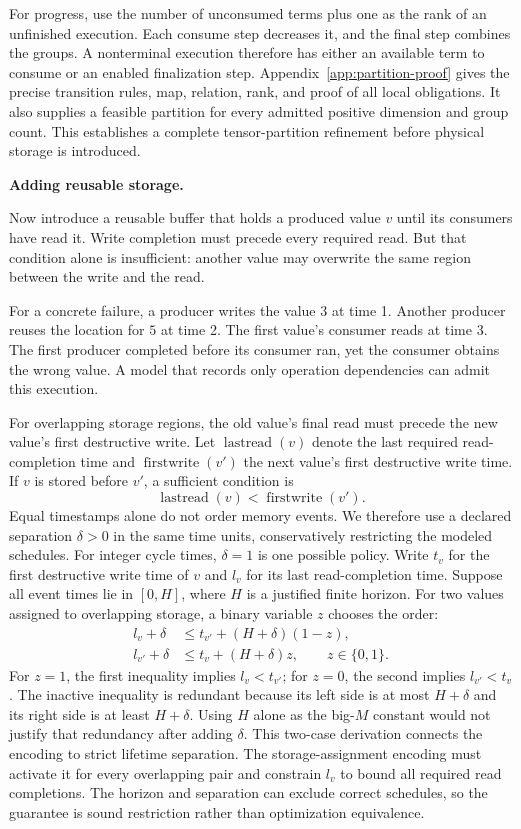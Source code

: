 \documentclass[11pt]{article}
\begin{document}
For progress, use the number of unconsumed terms plus one as the rank of an unfinished execution. Each consume step decreases it, and the final step combines the groups. A nonterminal execution therefore has either an available term to consume or an enabled finalization step. Appendix~\ref{app:partition-proof} gives the precise transition rules, map, relation, rank, and proof of all local obligations. It also supplies a feasible partition for every admitted positive dimension and group count. This establishes a complete tensor-partition refinement before physical storage is introduced.

\textbf{Adding reusable storage.}

Now introduce a reusable buffer that holds a produced value $v$ until its consumers have read it. Write completion must precede every required read. But that condition alone is insufficient: another value may overwrite the same region between the write and the read.

For a concrete failure, a producer writes the value $3$ at time 1. Another producer reuses the location for $5$ at time 2. The first value's consumer reads at time 3. The first producer completed before its consumer ran, yet the consumer obtains the wrong value. A model that records only operation dependencies can admit this execution.

For overlapping storage regions, the old value's final read must precede the new value's first destructive write. Let $\operatorname{lastread}(v)$ denote the last required read-completion time and $\operatorname{firstwrite}(v')$ the next value's first destructive write time. If $v$ is stored before $v'$, a sufficient condition is
\begin{equation}
 \operatorname{lastread}(v)<\operatorname{firstwrite}(v').
\end{equation}
Equal timestamps alone do not order memory events. We therefore use a declared separation $\delta>0$ in the same time units, conservatively restricting the modeled schedules. For integer cycle times, $\delta=1$ is one possible policy. Write $t_v$ for the first destructive write time of $v$ and $l_v$ for its last read-completion time. Suppose all event times lie in $[0,H]$, where $H$ is a justified finite horizon. For two values assigned to overlapping storage, a binary variable $z$ chooses the order:
\begin{align}
 l_v+\delta &\leq t_{v'}+(H+\delta)(1-z),\\
 l_{v'}+\delta &\leq t_v+(H+\delta)z,\qquad z\in\{0,1\}.
 \label{eq:separated-lifetimes}
\end{align}
For $z=1$, the first inequality implies $l_v<t_{v'}$; for $z=0$, the second implies $l_{v'}<t_v$. The inactive inequality is redundant because its left side is at most $H+\delta$ and its right side is at least $H+\delta$. Using $H$ alone as the big-$M$ constant would not justify that redundancy after adding $\delta$. This two-case derivation connects the encoding to strict lifetime separation. The storage-assignment encoding must activate it for every overlapping pair and constrain $l_v$ to bound all required read completions. The horizon and separation can exclude correct schedules, so the guarantee is sound restriction rather than optimization equivalence.
\end{document}
